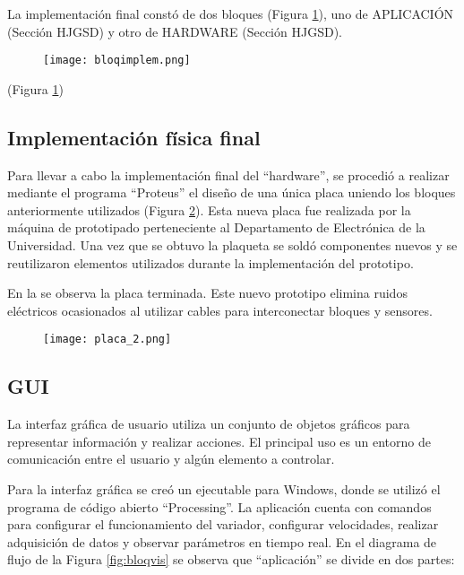La implementación final constó de dos bloques (Figura \ref{fig:implebloq}), uno de APLICACIÓN (Sección HJGSD) y otro de HARDWARE (Sección HJGSD).
\begin{figure}[h]
	\centering
	\texttt{[image: bloqimplem.png]}
	\label{fig:implebloq}
\end{figure}
(Figura \ref{fig:implebloq})






\subsection{Implementación física final}

Para llevar a cabo la implementación final del “hardware”, se procedió a realizar mediante el programa “Proteus” el diseño de una única placa uniendo los bloques anteriormente utilizados (Figura \ref{fig:hardBloq}). Esta nueva placa fue realizada por la máquina de prototipado  perteneciente al Departamento de Electrónica de la Universidad. Una vez que se obtuvo la plaqueta se soldó componentes nuevos y se reutilizaron elementos utilizados durante la implementación del prototipo.  

En la  se observa la placa terminada. Este nuevo prototipo elimina ruidos eléctricos ocasionados al utilizar cables para interconectar bloques y sensores.

\begin{figure}[h!]
	\centering
	\texttt{[image: placa\_2.png]}
	\label{fig:hardBloq}
\end{figure}



\subsection{GUI}
\begin{tcolorbox}[colback=blue!5!white,colframe=blue!75!black,title=GUI]
	La interfaz gráfica de usuario utiliza un conjunto de objetos gráficos para representar información y realizar acciones. El principal uso es un entorno de comunicación entre el usuario y algún elemento a controlar.
\end{tcolorbox}

Para la interfaz gráfica se creó un ejecutable para Windows, donde se utilizó el programa de código abierto “Processing”. La aplicación cuenta con comandos para configurar el funcionamiento del variador, configurar velocidades, realizar adquisición de datos y observar parámetros en tiempo real.
En el diagrama de flujo de la Figura \ref{fig:bloqvis} se observa que “aplicación” se divide en dos partes: 



